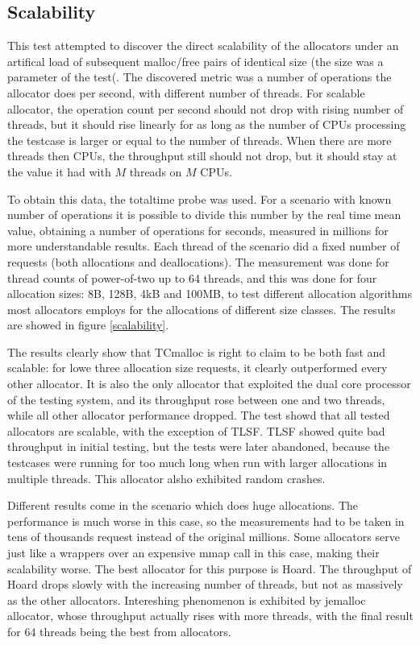 \subsection{Scalability}

This test attempted to discover the direct scalability of the allocators under an artifical load of subsequent malloc/free pairs of identical size (the size was a parameter of the test(. The discovered metric was a number of operations the allocator does per second, with different number of threads. For scalable allocator, the operation count per second should not drop with rising number of threads, but it should rise linearly for as long as the number of CPUs processing the testcase is larger or equal to the number of threads. When there are more threads then CPUs, the throughput still should not drop, but it should stay at the value it had with $M$ threads on $M$ CPUs.

To obtain this data, the totaltime probe was used. For a scenario with known number of operations it is possible to divide this number by the real time mean value, obtaining a number of operations for seconds, measured in millions for more understandable results. Each thread of the scenario did a fixed number of requests (both allocations and deallocations). The measurement was done for thread counts of power-of-two up to 64 threads, and this was done for four allocation sizes: 8B, 128B, 4kB and 100MB, to test different allocation algorithms most allocators employs for the allocations of different size classes. The results are showed in figure \ref{scalability}.

The results clearly show that TCmalloc is right to claim to be both fast and scalable: for lowe three allocation size requests, it clearly outperformed every other allocator. It is also the only allocator that exploited the dual core processor of the testing system, and its throughput rose between one and two threads, while all other allocator performance dropped. The test showd that all tested allocators are scalable, with the exception of TLSF. TLSF showed quite bad throughput in initial testing, but the tests were later abandoned, because the testcases were running for too much long when run with larger allocations in multiple threads. This allocator alsho exhibited random crashes.

Different results come in the scenario which does huge allocations. The performance is much worse in this case, so the measurements had to be taken in tens of thousands request instead of the original millions. Some allocators serve just like a wrappers over an expensive mmap call in this case, making their scalability worse. The best allocator for this purpose is Hoard. The throughput of Hoard drops slowly with the increasing number of threads, but not as massively as the other allocators. Intereshing phenomenon is exhibited by jemalloc allocator, whose throughput actually rises with more threads, with the final result for 64 threads being the best from allocators.

